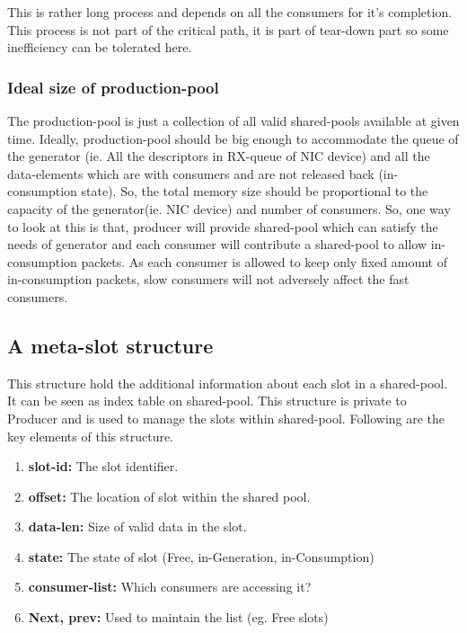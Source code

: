 \documentclass[a4paper,twoside]{report} %
\begin{document}
This is rather long process and depends on all the consumers for it's
completion.  This process is not part of the critical path, it is part
of tear-down part so some inefficiency can be tolerated here.




\subsubsection{Ideal size of production-pool}
The production-pool is just a collection of all valid shared-pools
available at given time.  Ideally, production-pool should be big enough 
to accommodate the queue of the generator (ie. All the descriptors 
in RX-queue of NIC device) and all the data-elements which are with 
consumers and are not released back (in-consumption state).  
So, the total memory size should be proportional to the capacity of 
the generator(ie. NIC device) and number of consumers.  
So, one way to look at this is that, producer will provide shared-pool
which can satisfy the needs of generator and each consumer will
contribute a shared-pool to allow in-consumption packets.
As each consumer is allowed to keep only fixed amount of 
in-consumption packets, slow consumers will not adversely 
affect the fast consumers.


\subsection{A meta-slot structure}
This structure hold the additional information about each slot in
a shared-pool.  It can be seen as index table on shared-pool.
This structure is private to Producer and is used to manage the
slots within shared-pool.  Following are the key elements of 
this structure.
\begin{enumerate} 
  \item \textbf{slot-id:} The slot identifier. 
  \item \textbf{offset:} The location of slot within the shared pool.
  \item \textbf{data-len:} Size of valid data in the slot.
  \item \textbf{state:} The state of slot (Free, in-Generation, 
  in-Consumption)
  \item \textbf{consumer-list:} Which consumers are accessing it? 
  \item \textbf{Next, prev:} Used to maintain the list (eg. Free slots)
\end{enumerate} 
\end{document}
